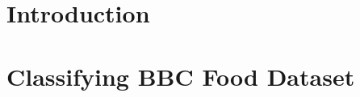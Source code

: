 \documentclass[11pt,twoside,a4paper]{article}
\author{Ross Fenning}
\begin{document}
\section{Introduction}



\section{Classifying BBC Food Dataset}

\section{}

\section{}
\end{document}
